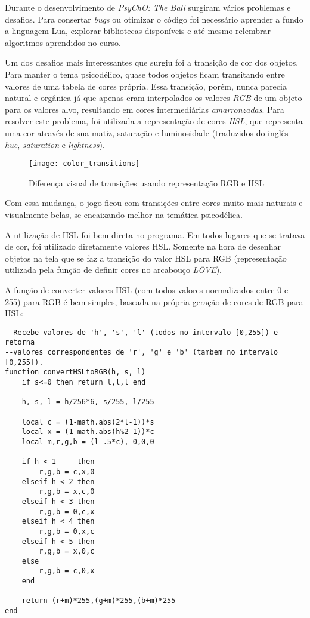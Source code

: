 Durante o desenvolvimento de \textit{PsyChO: The Ball} surgiram vários problemas e desafios. Para consertar \textit{bugs} ou otimizar o código foi necessário aprender a fundo a linguagem Lua, explorar bibliotecas disponíveis e até mesmo relembrar algoritmos aprendidos no curso.

Um dos desafios mais interessantes que surgiu foi a transição de cor dos objetos. Para manter o tema psicodélico, quase todos objetos ficam transitando entre valores de uma tabela de cores própria. Essa transição, porém, nunca parecia natural e orgânica já que apenas eram interpolados os valores \textit{RGB} de um objeto para os valores alvo, resultando em cores intermediárias \textit{amarronzadas}. Para resolver este problema, foi utilizada a representação de cores \textit{HSL}, que representa uma cor através de sua matiz, saturação e luminosidade (traduzidos do inglês \textit{hue}, \textit{saturation} e \textit{lightness}).

\begin{figure}[h!]
\texttt{[image: color\_transitions]}
\centering
\caption{Diferença visual de transições usando representação RGB e HSL}
\end{figure}

Com essa mudança, o jogo ficou com transições entre cores muito mais naturais e visualmente belas, se encaixando melhor na temática psicodélica.

A utilização de HSL foi bem direta no programa. Em todos lugares que se tratava de cor, foi utilizado diretamente valores HSL. Somente na hora de desenhar objetos na tela que se faz a transição do valor HSL para RGB (representação utilizada pela função de definir cores no arcabouço \textit{LÖVE}).

A função de converter valores HSL (com todos valores normalizados entre 0 e 255) para RGB é bem simples, baseada na própria geração de cores de RGB para HSL:

\begin{lstlisting}[language={[5.0]lua}]
--Recebe valores de 'h', 's', 'l' (todos no intervalo [0,255]) e retorna
--valores correspondentes de 'r', 'g' e 'b' (tambem no intervalo [0,255]).
function convertHSLtoRGB(h, s, l)
	if s<=0 then return l,l,l end

	h, s, l = h/256*6, s/255, l/255

	local c = (1-math.abs(2*l-1))*s
	local x = (1-math.abs(h%2-1))*c
	local m,r,g,b = (l-.5*c), 0,0,0

	if h < 1     then
		r,g,b = c,x,0
	elseif h < 2 then
	 	r,g,b = x,c,0
	elseif h < 3 then
	 	r,g,b = 0,c,x
	elseif h < 4 then
	 	r,g,b = 0,x,c
	elseif h < 5 then
	 	r,g,b = x,0,c
	else
	 	r,g,b = c,0,x
	end

	return (r+m)*255,(g+m)*255,(b+m)*255
end
\end{lstlisting}


